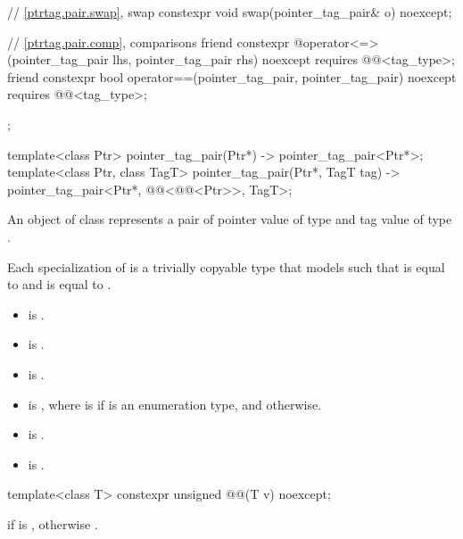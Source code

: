 \begin{codeblock}
{{    // \ref{ptrtag.pair.swap}, swap
    constexpr void swap(pointer_tag_pair& o) noexcept;

    // \ref{ptrtag.pair.comp}, comparisons
    friend constexpr @\seebelow@ operator<=>(pointer_tag_pair lhs, pointer_tag_pair rhs)
      noexcept requires @@<tag_type>;
    friend constexpr bool operator==(pointer_tag_pair, pointer_tag_pair)
      noexcept requires @@<tag_type>;
  };

  template<class Ptr>
    pointer_tag_pair(Ptr*)
      -> pointer_tag_pair<Ptr*>;
  template<class Ptr, class TagT>
    pointer_tag_pair(Ptr*, TagT tag)
      -> pointer_tag_pair<Ptr*, @@<@@<Ptr>>, TagT>;
}
\end{codeblock}

\pnum
An object of class 
represents a pair of
pointer value of type  and
tag value of type .

\pnum
Each specialization  of 
is a trivially copyable type that models  such that
 is equal to  and
 is equal to .

\pnum
\mandates
\begin{itemize}
\item {} is .
\item {} is .
\item {} is .
\item {} is ,
where  is
 if  is an enumeration type, and
 otherwise.
\item {} is .
\item {} is .
\end{itemize}

%
\begin{itemdecl}
template<class T> constexpr unsigned @@(T v) noexcept;
\end{itemdecl}

\begin{itemdescr}
\pnum
\returns
{}
if  is ,
otherwise .
\end{itemdescr}

